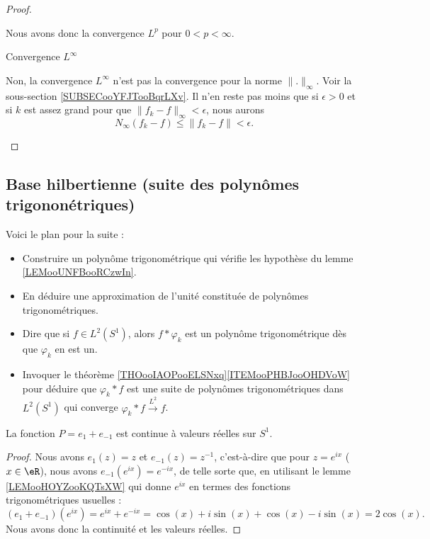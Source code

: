 \begin{proof}
\begin{subproof}
            Nous avons donc la convergence \( L^p\) pour \( 0<p<\infty\).
        \item[Convergence \( L^{\infty}\)]
 
            Non, la convergence \( L^{\infty}\) n'est pas la convergence pour la norme \( \| . \|_{\infty}\). Voir la sous-section \ref{SUBSECooYFJTooBqrLXv}. Il n'en reste pas moins que si \( \epsilon>0\) et si \( k\) est assez grand pour que \( \| f_k-f \|_{\infty}<\epsilon\), nous aurons
            \begin{equation}
                N_{\infty}(f_k-f)\leq \| f_k-f \|<\epsilon.
            \end{equation}
    \end{subproof}
\end{proof}

\subsection{Base hilbertienne (suite des polynômes trigononétriques)}

Voici le plan pour la suite :
\begin{itemize}
    \item Construire un polynôme trigonométrique qui vérifie les hypothèse du lemme \ref{LEMooUNFBooRCzwIn}.
    \item En déduire une approximation de l'unité constituée de polynômes trigonométriques.
    \item Dire que si \( f\in L^2(S^1)\), alors \( f*\varphi_k\) est un polynôme trigonométrique dès que \( \varphi_k\) en est un.
    \item Invoquer le théorème \ref{THOooIAOPooELSNxq}\ref{ITEMooPHBJooOHDVoW} pour déduire que \( \varphi_k*f\) est une suite de polynômes trigonométriques dans \( L^2(S^1)\) qui converge \( \varphi_k*f\stackrel{L^2}{\longrightarrow}f\).
\end{itemize}

\begin{lemma}       \label{LEMooQQILooWlhntZ}
    La fonction \( P=e_1+e_{-1}\) est continue à valeurs réelles sur \( S^1\).
\end{lemma}

\begin{proof}
    Nous avons \( e_1(z)=z\) et \( e_{-1}(z)=z^{-1}\), c'est-à-dire que pour \( z= e^{ix}\) (\( x\in \eR\)), nous avons \( e_{-1}( e^{ix})= e^{-ix}\), de telle sorte que, en utilisant le lemme \ref{LEMooHOYZooKQTsXW} qui donne \(  e^{ix}\) en termes des fonctions trigonométriques usuelles :
    \begin{equation}
        (e_1+e_{-1})( e^{ix})= e^{ix}+ e^{-ix}=\cos(x)+i\sin(x)+\cos(x)-i\sin(x)=2\cos(x).
    \end{equation}
    Nous avons donc la continuité et les valeurs réelles.
\end{proof}

